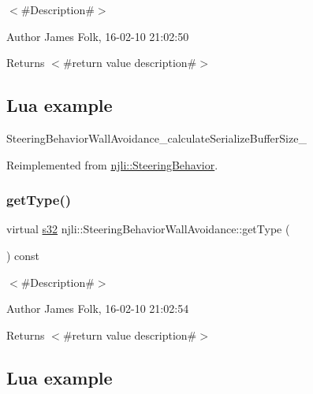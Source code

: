 $<$\#\+Description\#$>$ 

\begin{DoxyAuthor}{Author}
James Folk, 16-\/02-\/10 21\+:02\+:50
\end{DoxyAuthor}
\begin{DoxyReturn}{Returns}
$<$\#return value description\#$>$
\end{DoxyReturn}
\hypertarget{classnjli_1_1_steering_behavior_wander_ex1}{}\subsection{Lua example}\label{classnjli_1_1_steering_behavior_wander_ex1}

\begin{DoxyCodeInclude}
\end{DoxyCodeInclude}
Steering\+Behavior\+Wall\+Avoidance\+\_\+calculate\+Serialize\+Buffer\+Size\+\_\+ 

Reimplemented from \mbox{\hyperlink{classnjli_1_1_steering_behavior_abb58d6982dc295fc3e90f096f51b0ef8}{njli\+::\+Steering\+Behavior}}.

\mbox{\label{classnjli_1_1_steering_behavior_wall_avoidance_a9673759d2e88ddf33de1316966d7ba67}} 
\subsubsection{\texorpdfstring{get\+Type()}{getType()}}
{\footnotesize\ttfamily virtual \mbox{\hyperlink{_util_8h_aa62c75d314a0d1f37f79c4b73b2292e2}{s32}} njli\+::\+Steering\+Behavior\+Wall\+Avoidance\+::get\+Type (\begin{DoxyParamCaption}{ }\end{DoxyParamCaption}) const\hspace{0.3cm}{\ttfamily [virtual]}}



$<$\#\+Description\#$>$ 

\begin{DoxyAuthor}{Author}
James Folk, 16-\/02-\/10 21\+:02\+:54
\end{DoxyAuthor}
\begin{DoxyReturn}{Returns}
$<$\#return value description\#$>$
\end{DoxyReturn}
\hypertarget{classnjli_1_1_steering_behavior_wander_ex1}{}\subsection{Lua example}\label{classnjli_1_1_steering_behavior_wander_ex1}

